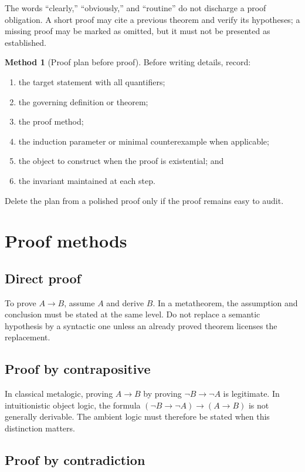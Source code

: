 \documentclass[11pt,oneside,openany]{book}
\theoremstyle{definition}
\newtheorem{method}[definition]{Method}
\theoremstyle{plain}
\theoremstyle{remark}
\begin{document}
The words ``clearly,'' ``obviously,'' and ``routine'' do not discharge a proof
obligation.  A short proof may cite a previous theorem and verify its
hypotheses; a missing proof may be marked as omitted, but it must not be
presented as established.

\begin{method}[Proof plan before proof]
Before writing details, record:
\begin{enumerate}
  \item the target statement with all quantifiers;
  \item the governing definition or theorem;
  \item the proof method;
  \item the induction parameter or minimal counterexample when applicable;
  \item the object to construct when the proof is existential; and
  \item the invariant maintained at each step.
\end{enumerate}
Delete the plan from a polished proof only if the proof remains easy to audit.
\end{method}

\section{Proof methods}
\label{sec:writing-foundations-04}

\subsection{Direct proof}

To prove \(A\to B\), assume \(A\) and derive \(B\).  In a metatheorem, the
assumption and conclusion must be stated at the same level.  Do not replace a
semantic hypothesis by a syntactic one unless an already proved theorem
licenses the replacement.

\subsection{Proof by contrapositive}

In classical metalogic, proving \(A\to B\) by proving
\(\neg B\to\neg A\) is legitimate.  In intuitionistic object logic, the
formula \((\neg B\to\neg A)\to(A\to B)\) is not generally derivable.  The
ambient logic must therefore be stated when this distinction matters.

\subsection{Proof by contradiction}
\end{document}
